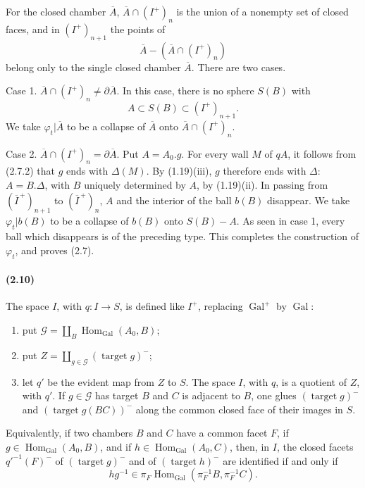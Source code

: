 \documentclass[10pt]{article}
\begin{document}
For the closed chamber \(\overline A\), \(\overline A\cap(I^+)_n\) is the union of a nonempty set of closed faces, and in \((I^+)_{n+1}\) the points of
\[
\overline A-(\overline A\cap(I^+)_n)
\]
belong only to the single closed chamber \(\overline A\). There are two cases.

Case 1. \(\overline A\cap(I^+)_n\ne\partial\overline A\). In this case, there is no sphere \(S(B)\) with
\[
A\subset S(B)\subset (I^+)_{n+1}.
\]
We take \(\varphi_t|\overline A\) to be a collapse of \(\overline A\) onto \(\overline A\cap(I^+)_n\).

Case 2. \(\overline A\cap(I^+)_n=\partial\overline A\). Put \(A=A_0.g\). For every wall \(M\) of \(qA\), it follows from (2.7.2) that \(g\) ends with \(\Delta(M)\). By (1.19)(iii), \(g\) therefore ends with \(\Delta\): \(A=B.\Delta\), with \(B\) uniquely determined by \(A\), by (1.19)(ii). In passing from \((\overline I^{\, +})_{n+1}\) to \((\overline I^{\, +})_n\), \(A\) and the interior of the ball \(b(B)\) disappear. We take \(\varphi_t|b(B)\) to be a collapse of \(b(B)\) onto \(S(B)-A\). As seen in case 1, every ball which disappears is of the preceding type. This completes the construction of \(\varphi_t\), and proves (2.7).

\paragraph{(2.10)} The space \(I\), with \(q:I\to S\), is defined like \(I^+\), replacing \(\operatorname{Gal}^+\) by \(\operatorname{Gal}\):
\begin{enumerate}[label=\alph*)]
\item put \(\mathcal G=\coprod_B\operatorname{Hom}_{\operatorname{Gal}}(A_0,B)\);
\item put \(Z=\coprod_{g\in\mathcal G}(\operatorname{target}g)^{-}\);
\item let \(q'\) be the evident map from \(Z\) to \(S\). The space \(I\), with \(q\), is a quotient of \(Z\), with \(q'\). If \(g\in\mathcal G\) has target \(B\) and \(C\) is adjacent to \(B\), one glues \((\operatorname{target}g)^{-}\) and \((\operatorname{target}g(BC))^{-}\) along the common closed face of their images in \(S\).
\end{enumerate}
Equivalently, if two chambers \(B\) and \(C\) have a common facet \(F\), if \(g\in\operatorname{Hom}_{\operatorname{Gal}}(A_0,B)\), and if \(h\in\operatorname{Hom}_{\operatorname{Gal}}(A_0,C)\), then, in \(I\), the closed facets \(q'^{-1}(F)^{-}\) of \((\operatorname{target}g)^{-}\) and of \((\operatorname{target}h)^{-}\) are identified if and only if
\[
hg^{-1}\in \pi_F\operatorname{Hom}_{\operatorname{Gal}}(\pi_F^{-1}B,\pi_F^{-1}C).
\]
\end{document}
